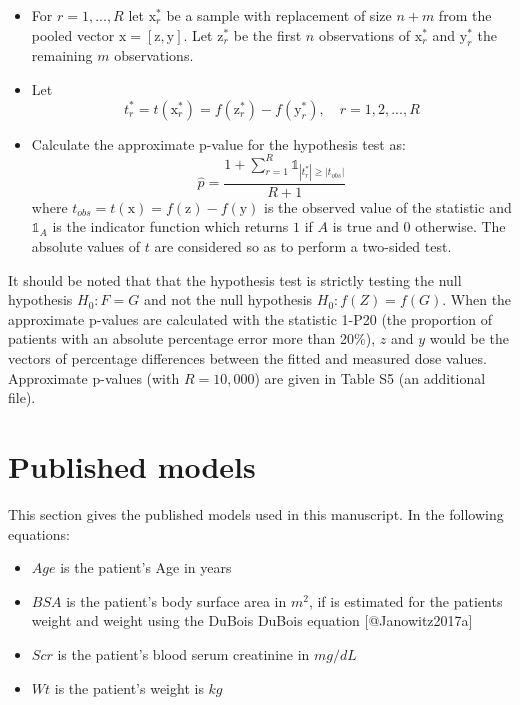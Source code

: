 \documentclass[11pt,]{article}
\begin{document}
\begin{itemize}
\item For $r = 1, ..., R$ let $\mathrm{x}^*_r$ be a sample with replacement of size $n+m$ from the pooled vector $\mathrm{x} = [\mathrm{z}, \mathrm{y}]$. Let $\mathrm{z}^*_r$ be the first $n$ observations of  $\mathrm{x}^*_r$ and $\mathrm{y}^*_r$ the remaining $m$ observations.
\item Let 
$$t_r^* = t(\mathrm{x}^*_r) = f(\mathrm{z}^*_r) - f(\mathrm{y}^*_r), \quad r = 1, 2, ..., R$$
\item Calculate the approximate p-value for the hypothesis test as: 
$$ \widehat{p} =\frac{1 + \sum_{r=1}^R \mathbb{1}_{\left| t_r^*\right| \geq \left| t_{obs}\right|}}{R + 1}$$ 
where $t_{obs} = t(\mathrm{x}) = f(\mathrm{z}) - f(\mathrm{y})$ is the observed value of the statistic and $\mathbb{1}_A$ is the indicator function which returns $1$ if $A$ is true and $0$ otherwise. The absolute values of $t$ are considered so as to perform a two-sided test. 
\end{itemize}

It should be noted that that the hypothesis test is strictly testing the
null hypothesis \(H_0 :F=G\) and not the null hypothesis
\(H_0: f(Z) = f(G)\). When the approximate p-values are calculated with
the statistic 1-P20 (the proportion of patients with an absolute
percentage error more than 20\%), \(z\) and \(y\) would be the vectors
of percentage differences between the fitted and measured dose values.
Approximate p-values (with \(R = 10,000\)) are given in Table S5 (an
additional file).

\newpage

\section{Published models}\label{published-models}

This section gives the published models used in this manuscript. In the
following equations:

\begin{itemize}
\item $Age$ is the patient's Age in years
\item $BSA$ is the patient's body surface area in $m^2$, if is estimated for the patients weight and weight using the DuBois DuBois equation [@Janowitz2017a] 
\item $Scr$ is the patient's blood serum creatinine in $mg/dL$
\item $Wt$ is the patient's weight is $kg$
\end{itemize}
\end{document}
